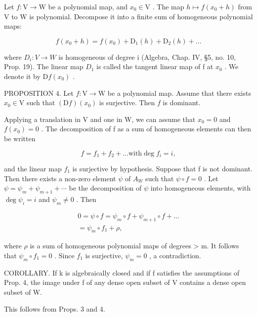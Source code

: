 Let \(f: \mathrm{V} \to \mathrm{W}\) be a polynomial map, and \(x_0 \in \mathrm{V}\) . The map \(h \mapsto f(x_0 + h)\) from \(\mathrm{V}\) to \(\mathrm{W}\) is polynomial. Decompose it into a finite sum of homogeneous polynomial maps:

\[
f (x _ {0} + h) = f (x _ {0}) + \mathrm{D} _ {1} (h) + \mathrm{D} _ {2} (h) + \dots
\]

where \(D_{i}: V \to W\) is homogeneous of degree i (Algebra, Chap. IV, §5, no. 10, Prop. 19). The linear map \(D_{1}\) is called the tangent linear map of f at \(x_{0}\) . We denote it by \(\mathrm{D}f(x_{0})\) .

PROPOSITION 4. Let \(f: \mathrm{V} \to \mathrm{W}\) be a polynomial map. Assume that there exists \(x_0 \in \mathrm{V}\) such that \((\mathrm{D}f)(x_0)\) is surjective. Then \(f\) is dominant.

Applying a translation in V and one in W, we can assume that \(x_{0} = 0\) and \(f(x_{0}) = 0\) . The decomposition of f as a sum of homogeneous elements can then be written

\[
f = f _ {1} + f _ {2} + \dots \text {with} \deg f _ {i} = i,
\]

and the linear map \(f_{1}\) is surjective by hypothesis. Suppose that f is not dominant. Then there exists a non-zero element \(\psi\) of \(A_{W}\) such that \(\psi \circ f = 0\) . Let \(\psi = \psi_{m} + \psi_{m+1} + \cdots\) be the decomposition of \(\psi\) into homogeneous elements, with \(\deg \psi_{i} = i\) and \(\psi_{m} \neq 0\) . Then

\[
\begin{array}{l} 0 = \psi \circ f = \psi_ {m} \circ f + \psi_ {m + 1} \circ f + \dots \\ = \psi_ {m} \circ f _ {1} + \rho , \end{array}
\]

where \(\rho\) is a sum of homogeneous polynomial maps of degrees \textgreater{} m. It follows that \(\psi_{m} \circ f_{1} = 0\) . Since \(f_{1}\) is surjective, \(\psi_{m} = 0\) , a contradiction.

COROLLARY. If k is algebraically closed and if f satisfies the assumptions of Prop. 4, the image under f of any dense open subset of V contains a dense open subset of W.

This follows from Props. 3 and 4.